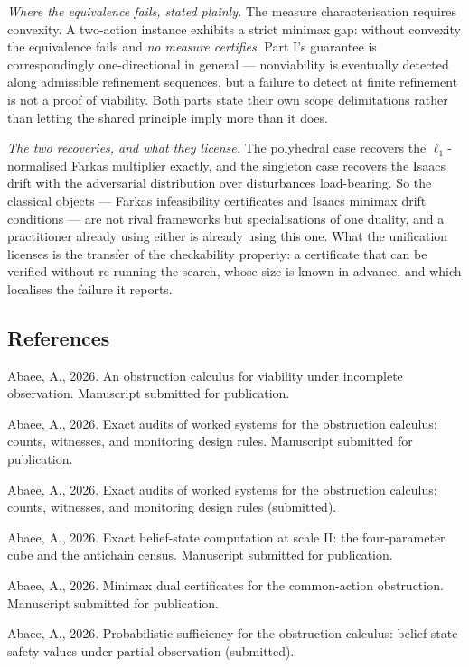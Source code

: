 \documentclass[10pt,twocolumn]{article}
\theoremstyle{plain}
\theoremstyle{definition}
\theoremstyle{remark}
\begin{document}
\emph{Where the equivalence fails, stated plainly.} The measure characterisation requires convexity.
A two-action instance exhibits a strict minimax gap: without convexity the equivalence fails and
\emph{no measure certifies}. Part I's guarantee is correspondingly one-directional in general ---
nonviability is eventually detected along admissible refinement sequences, but a failure to detect
at finite refinement is not a proof of viability. Both parts state their own scope delimitations
rather than letting the shared principle imply more than it does.

\emph{The two recoveries, and what they license.} The polyhedral case recovers the
$\ell_1$-normalised Farkas multiplier exactly, and the singleton case recovers the Isaacs drift
with the adversarial distribution over disturbances load-bearing. So the classical objects --- Farkas
infeasibility certificates and Isaacs minimax drift conditions --- are not rival frameworks but
specialisations of one duality, and a practitioner already using either is already using this one.
What the unification licenses is the transfer of the checkability property: a certificate that can
be verified without re-running the search, whose size is known in advance, and which localises the
failure it reports.

\subsection*{References}
\label{references}
Abaee, A., 2026. An obstruction calculus for viability under incomplete
observation. Manuscript submitted for publication.

Abaee, A., 2026. Exact audits of worked systems for the obstruction
calculus: counts, witnesses, and monitoring design rules. Manuscript
submitted for publication.

Abaee, A., 2026. Exact audits of worked systems for the obstruction calculus:
counts, witnesses, and monitoring design rules (submitted).

Abaee, A., 2026. Exact belief-state computation at scale II: the
four-parameter cube and the antichain census. Manuscript submitted for
publication.

Abaee, A., 2026. Minimax dual certificates for the common-action
obstruction. Manuscript submitted for publication.

Abaee, A., 2026. Probabilistic sufficiency for the obstruction calculus:
belief-state safety values under partial observation (submitted).
\end{document}
